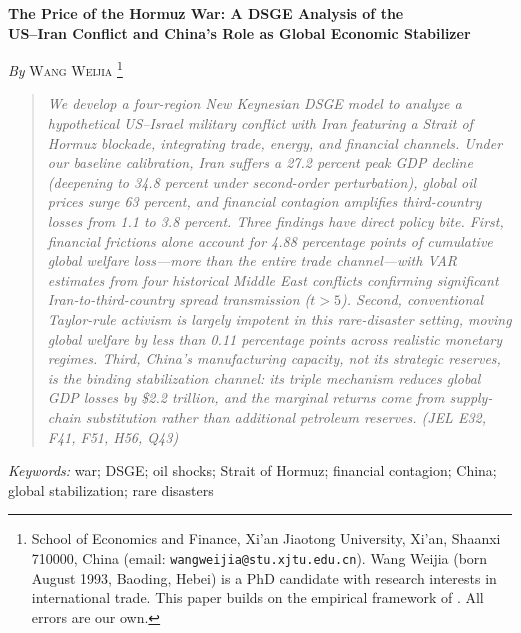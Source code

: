 \documentclass[12pt,a4paper]{article}
\begin{document}
\begin{center}
{\large\bfseries The Price of the Hormuz War: A DSGE Analysis of the\\[0.4em]
US--Iran Conflict and China's Role as Global Economic Stabilizer\par}
\vspace{0.9em}
{\normalsize \textit{By} \textsc{Wang Weijia}%
\footnote{School of Economics and Finance, Xi'an Jiaotong University,
Xi'an, Shaanxi 710000, China (email: \texttt{wangweijia@stu.xjtu.edu.cn}).
Wang Weijia (born August 1993, Baoding, Hebei) is a PhD candidate with
research interests in international trade.
This paper builds on the empirical framework of \citet{federle2026price}.
All errors are our own.}\par}
\end{center}
\vspace{0.9em}

\begin{quote}
\itshape
We develop a four-region New Keynesian DSGE model to analyze a hypothetical
US--Israel military conflict with Iran featuring a Strait of Hormuz blockade,
integrating trade, energy, and financial channels. Under our baseline
calibration, Iran suffers a 27.2 percent peak GDP decline (deepening to
34.8 percent under second-order perturbation), global oil prices surge
63 percent, and financial contagion amplifies third-country losses from
1.1 to 3.8 percent. Three findings have direct policy bite.
\emph{First}, financial frictions alone account for 4.88 percentage points
of cumulative global welfare loss---more than the entire trade channel---with
VAR estimates from four historical Middle East conflicts confirming significant
Iran-to-third-country spread transmission ($t > 5$).
\emph{Second}, conventional Taylor-rule activism is largely impotent in this
rare-disaster setting, moving global welfare by less than 0.11 percentage
points across realistic monetary regimes.
\emph{Third}, China's manufacturing capacity, not its strategic reserves,
is the binding stabilization channel: its triple mechanism reduces global
GDP losses by \$2.2 trillion, and the marginal returns come from
supply-chain substitution rather than additional petroleum reserves.
(\textit{JEL} E32, F41, F51, H56, Q43)
\end{quote}

\vspace{0.3em}
\noindent\textit{Keywords:} war; DSGE; oil shocks; Strait of Hormuz; financial contagion; China; global stabilization; rare disasters
\end{document}
